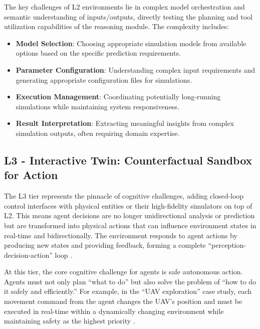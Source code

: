 The key challenges of L2 environments lie in complex model orchestration and semantic understanding of inputs/outputs, directly testing the planning and tool utilization capabilities of the reasoning module. The complexity includes:
\begin{itemize}
\item \textbf{Model Selection}: Choosing appropriate simulation models from available options based on the specific prediction requirements.
\item \textbf{Parameter Configuration}: Understanding complex input requirements and generating appropriate configuration files for simulations.
\item \textbf{Execution Management}: Coordinating potentially long-running simulations while maintaining system responsiveness.
\item \textbf{Result Interpretation}: Extracting meaningful insights from complex simulation outputs, often requiring domain expertise.
\end{itemize}

\subsection{L3 - Interactive Twin: Counterfactual Sandbox for Action}

The L3 tier represents the pinnacle of cognitive challenges, adding closed-loop control interfaces with physical entities or their high-fidelity simulators on top of L2. This means agent decisions are no longer unidirectional analysis or prediction but are transformed into physical actions that can influence environment states in real-time and bidirectionally. The environment responds to agent actions by producing new states and providing feedback, forming a complete ``perception-decision-action'' loop \cite{thrun2002probabilistic}.

At this tier, the core cognitive challenge for agents is safe autonomous action. Agents must not only plan ``what to do'' but also solve the problem of ``how to do it safely and efficiently.'' For example, in the ``UAV exploration'' case study, each movement command from the agent changes the UAV's position and must be executed in real-time within a dynamically changing environment while maintaining safety as the highest priority \cite{grande2012scan}.

